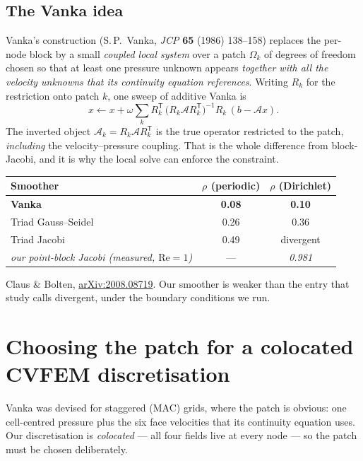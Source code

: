 \documentclass[11pt,a4paper]{article}
\newcommand{\Rey}{\mathrm{Re}}
\begin{document}
\subsection{The Vanka idea}
Vanka's construction (S.\,P.\ Vanka, \emph{JCP} \textbf{65} (1986) 138--158) replaces the
per-node block by a small \emph{coupled local system} over a patch $\Omega_k$ of degrees of
freedom chosen so that at least one pressure unknown appears \emph{together with all the
velocity unknowns that its continuity equation references}. Writing $R_k$ for the restriction
onto patch $k$, one sweep of additive Vanka is
\begin{equation}
x \leftarrow x + \omega \sum_k R_k^{\mathsf T}\,
\big( R_k \mathcal{A} R_k^{\mathsf T} \big)^{-1} R_k \, (b - \mathcal{A}x).
\label{eq:vanka}
\end{equation}
The inverted object $\mathcal{A}_k = R_k \mathcal{A} R_k^{\mathsf T}$ is the true operator
restricted to the patch, \emph{including} the velocity--pressure coupling. That is the whole
difference from block-Jacobi, and it is why the local solve can enforce the constraint.

\begin{tcolorbox}[colback=blue!4,colframe=blue!50!black,title={\bfseries Published rates (Stokes, LFA)}]
\begin{center}
\begin{tabular}{@{}lcc@{}}
\toprule
Smoother & $\rho$ (periodic) & $\rho$ (Dirichlet) \\
\midrule
\textbf{Vanka} & \textbf{0.08} & \textbf{0.10} \\
Triad Gauss--Seidel & 0.26 & 0.36 \\
Triad Jacobi & 0.49 & divergent \\
\midrule
\emph{our point-block Jacobi (measured, $\Rey{=}1$)} & --- & \emph{0.981} \\
\bottomrule
\end{tabular}
\end{center}
Claus \& Bolten, \href{https://arxiv.org/pdf/2008.08719}{arXiv:2008.08719}. Our smoother is
weaker than the entry that study calls divergent, under the boundary conditions we run.
\end{tcolorbox}

\section{Choosing the patch for a colocated CVFEM discretisation}

Vanka was devised for staggered (MAC) grids, where the patch is obvious: one cell-centred
pressure plus the six face velocities that its continuity equation uses. Our discretisation is
\emph{colocated} --- all four fields live at every node --- so the patch must be chosen
deliberately.
\end{document}
